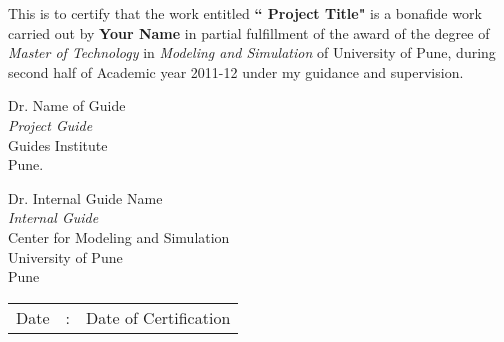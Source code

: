 


\begin{certificate}        %

This is to certify that the work entitled \textbf{`` Project Title"} is a bonafide work carried out by \textbf{Your Name} 
in partial fulfillment of the award of the degree of \textit{Master of Technology}
in \textit{Modeling and Simulation} of University of Pune, during second half of Academic year 2011-12 
under my guidance and supervision.

\vspace*{85pt}

\begin{minipage}[t]{0.5\textwidth}%
\begin{flushleft}
 
Dr. Name of Guide\\
\emph{Project Guide}\\
Guides Institute\\
Pune.
\end{flushleft}
\end{minipage}\hspace{0.5cm}
\begin{minipage}[t]{0.4\textwidth}%
\begin{flushleft}
 {
Dr. Internal Guide Name \\
\emph{Internal Guide}}\\
Center for Modeling and Simulation\\
University of Pune \\
Pune

\end{flushleft}

\end{minipage}
 \vfill
\begin{minipage}[t]{0.5\textwidth}%
\vspace*{135pt}
\begin{tabular}{lcl}
Date & : & Date of Certification \tabularnewline
\end{tabular}%
\end{minipage}\hspace{0.5cm}
\begin{minipage}[t]{0.4\textwidth}%

\end{minipage}
\end{certificate}




